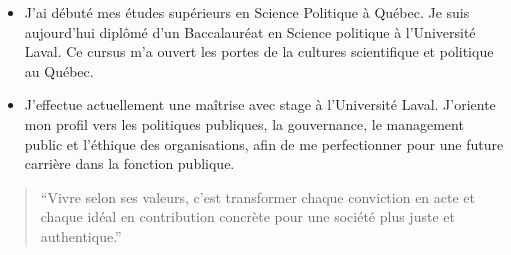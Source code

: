 \documentclass[10pt,a4paper,ragged2e,withhyper]{altacv}
\begin{document}
\begin{paracol}{2}

\begin{itemize}
\item J'ai débuté mes études supérieurs en Science Politique à Québec.
Je suis aujourd’hui diplômé d’un Baccalauréat en Science politique à l’Université Laval. Ce cursus m’a ouvert les portes de la cultures scientifique et politique au Québec.
\end{itemize}

\divider

\begin{itemize}
\item J'effectue actuellement une maîtrise avec stage à l’Université Laval. 
J'oriente mon profil vers les politiques publiques, la gouvernance, le management public et l'éthique des organisations, afin de me perfectionner pour une future carrière dans la fonction publique.
\end{itemize}


\switchcolumn

\begin{quote}
\justify
``Vivre selon ses valeurs, c'est transformer chaque conviction en acte et chaque idéal en contribution concrète pour une société plus juste et authentique.''
\end{quote}



\divider


\divider


\divider




\end{paracol}
\end{document}
